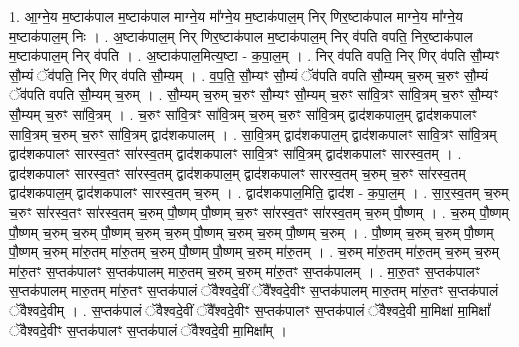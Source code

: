 \documentclass[17pt]{extarticle}
\begin{document}
1. आ॒ग्ने॒य म॒ष्टाक॑पाल म॒ष्टाक॑पाल माग्ने॒य मा᳚ग्ने॒य म॒ष्टाक॑पाल॒म् निर् णिर॒ष्टाक॑पाल माग्ने॒य मा᳚ग्ने॒य म॒ष्टाक॑पाल॒म् निः । . अ॒ष्टाक॑पाल॒म् निर् णिर॒ष्टाक॑पाल म॒ष्टाक॑पाल॒म् निर् व॑पति वपति॒ निर॒ष्टाक॑पाल म॒ष्टाक॑पाल॒म् निर् व॑पति । . अ॒ष्टाक॑पाल॒मित्य॒ष्टा - क॒पा॒ल॒म् । . निर् व॑पति वपति॒ निर् णिर् व॑पति सौ॒म्यꣳ सौ॒म्यं ॅव॑पति॒ निर् णिर् व॑पति सौ॒म्यम् । . व॒प॒ति॒ सौ॒म्यꣳ सौ॒म्यं ॅव॑पति वपति सौ॒म्यम् च॒रुम् च॒रुꣳ सौ॒म्यं ॅव॑पति वपति सौ॒म्यम् च॒रुम् । . सौ॒म्यम् च॒रुम् च॒रुꣳ सौ॒म्यꣳ सौ॒म्यम् च॒रुꣳ सा॑वि॒त्रꣳ सा॑वि॒त्रम् च॒रुꣳ सौ॒म्यꣳ सौ॒म्यम् च॒रुꣳ सा॑वि॒त्रम् । . च॒रुꣳ सा॑वि॒त्रꣳ सा॑वि॒त्रम् च॒रुम् च॒रुꣳ सा॑वि॒त्रम् द्वाद॑शकपाल॒म् द्वाद॑शकपालꣳ सावि॒त्रम् च॒रुम् च॒रुꣳ सा॑वि॒त्रम् द्वाद॑शकपालम् । . सा॒वि॒त्रम् द्वाद॑शकपाल॒म् द्वाद॑शकपालꣳ सावि॒त्रꣳ सा॑वि॒त्रम् द्वाद॑शकपालꣳ सारस्व॒तꣳ सा॑रस्व॒तम् द्वाद॑शकपालꣳ सावि॒त्रꣳ सा॑वि॒त्रम् द्वाद॑शकपालꣳ सारस्व॒तम् । . द्वाद॑शकपालꣳ सारस्व॒तꣳ सा॑रस्व॒तम् द्वाद॑शकपाल॒म् द्वाद॑शकपालꣳ सारस्व॒तम् च॒रुम् च॒रुꣳ सा॑रस्व॒तम् द्वाद॑शकपाल॒म् द्वाद॑शकपालꣳ सारस्व॒तम् च॒रुम् । . द्वाद॑शकपाल॒मिति॒ द्वाद॑श - क॒पा॒ल॒म् । . सा॒र॒स्व॒तम् च॒रुम् च॒रुꣳ सा॑रस्व॒तꣳ सा॑रस्व॒तम् च॒रुम् पौ॒ष्णम् पौ॒ष्णम् च॒रुꣳ सा॑रस्व॒तꣳ सा॑रस्व॒तम् च॒रुम् पौ॒ष्णम् । . च॒रुम् पौ॒ष्णम् पौ॒ष्णम् च॒रुम् च॒रुम् पौ॒ष्णम् च॒रुम् च॒रुम् पौ॒ष्णम् च॒रुम् च॒रुम् पौ॒ष्णम् च॒रुम् । . पौ॒ष्णम् च॒रुम् च॒रुम् पौ॒ष्णम् पौ॒ष्णम् च॒रुम् मा॑रु॒तम् मा॑रु॒तम् च॒रुम् पौ॒ष्णम् पौ॒ष्णम् च॒रुम् मा॑रु॒तम् । . च॒रुम् मा॑रु॒तम् मा॑रु॒तम् च॒रुम् च॒रुम् मा॑रु॒तꣳ स॒प्तक॑पालꣳ स॒प्तक॑पालम् मारु॒तम् च॒रुम् च॒रुम् मा॑रु॒तꣳ स॒प्तक॑पालम् । . मा॒रु॒तꣳ स॒प्तक॑पालꣳ स॒प्तक॑पालम् मारु॒तम् मा॑रु॒तꣳ स॒प्तक॑पालं ॅवैश्वदे॒वीं ॅवै᳚श्वदे॒वीꣳ स॒प्तक॑पालम् मारु॒तम् मा॑रु॒तꣳ स॒प्तक॑पालं ॅवैश्वदे॒वीम् । . स॒प्तक॑पालं ॅवैश्वदे॒वीं ॅवै᳚श्वदे॒वीꣳ स॒प्तक॑पालꣳ स॒प्तक॑पालं ॅवैश्वदे॒वी मा॒मिक्षा॑ मा॒मिक्षां᳚ ॅवैश्वदे॒वीꣳ स॒प्तक॑पालꣳ स॒प्तक॑पालं ॅवैश्वदे॒वी मा॒मिक्षा᳚म् । \newline
\end{document}

